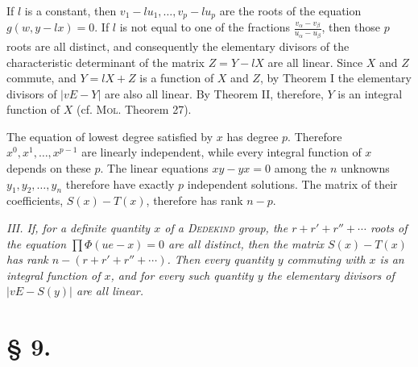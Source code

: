 \documentclass[11pt]{article}
\begin{document}
If $l$ is a constant, then $v_1-lu_1,\ldots,v_p-lu_p$ are the roots of the equation $g(w,y-lx)=0$. If $l$ is not equal to one of the fractions $\frac{v_\alpha-v_\beta}{u_\alpha-u_\beta}$, then those $p$ roots are all distinct, and consequently the elementary divisors of the characteristic determinant of the matrix $Z=Y-lX$ are all linear. Since $X$ and $Z$ commute, and $Y=lX+Z$ is a function of $X$ and $Z$, by Theorem I the elementary divisors of $|vE-Y|$ are also all linear. By Theorem II, therefore, $Y$ is an integral function of $X$ (cf. \textsc{Mol}. Theorem 27).

The equation of lowest degree satisfied by $x$ has degree $p$. Therefore $x^0,x^1,\ldots,x^{p-1}$ are linearly independent, while every integral function of $x$ depends on these $p$. The linear equations $xy-yx=0$ among the $n$ unknowns $y_1,y_2,\ldots,y_n$ therefore have exactly $p$ independent solutions. The matrix of their coefficients, $S(x)-T(x)$, therefore has rank $n-p$.

\emph{III. If, for a definite quantity $x$ of a \textsc{Dedekind} group, the $r+r'+r''+\cdots$ roots of the equation $\prod\Phi(ue-x)=0$ are all distinct, then the matrix $S(x)-T(x)$ has rank $n-(r+r'+r''+\cdots)$. Then every quantity $y$ commuting with $x$ is an integral function of $x$, and for every such quantity $y$ the elementary divisors of $|vE-S(y)|$ are all linear.}

\section*{§ 9.}
\end{document}
